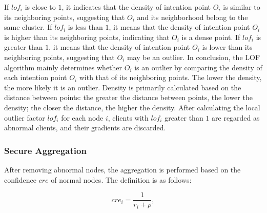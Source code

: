 \documentclass[lettersize,journal]{IEEEtran}
\begin{document}
If $lof_i$ is close to $1$, it indicates that the density of intention point $O_i$ is similar to its neighboring points, suggesting that $O_i$ and its neighborhood belong to the same cluster. If $lof_i$ is less than $1$, it means that the density of intention point $O_i$ is higher than its neighboring points, indicating that $O_i$ is a dense point. If $lof_i$ is greater than $1$, it means that the density of intention point $O_i$ is lower than its neighboring points, suggesting that $O_i$ may be an outlier. In conclusion, the LOF algorithm mainly determines whether $O_i$ is an outlier by comparing the density of each intention point $O_i$ with that of its neighboring points. The lower the density, the more likely it is an outlier. Density is primarily calculated based on the distance between points: the greater the distance between points, the lower the density; the closer the distance, the higher the density. After calculating the local outlier factor $lof_i$ for each node $i$, clients with $lof_i$ greater than $1$ are regarded as abnormal clients, and their gradients are discarded.

\subsubsection{Secure Aggregation}
After removing abnormal nodes, the aggregation is performed based on the confidence $cre$ of normal nodes. The definition is as follows:

\begin{equation}
    cre_i=\frac{1}{r_i+\rho},
\end{equation}

\end{document}
